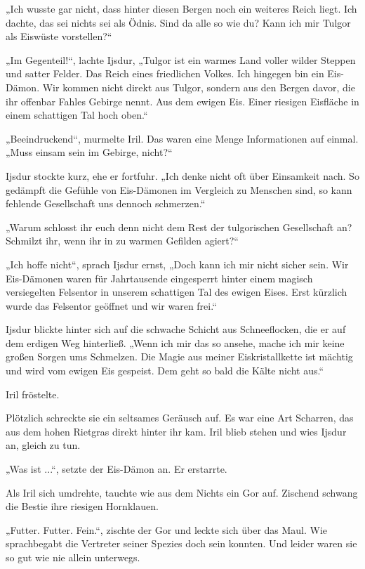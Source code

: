 „Ich wusste gar nicht, dass hinter diesen Bergen noch ein weiteres Reich liegt. Ich dachte, das sei nichts sei als Ödnis. Sind da alle so wie du? Kann ich mir Tulgor als Eiswüste vorstellen?“

„Im Gegenteil!“, lachte Ijsdur, „Tulgor ist ein warmes Land voller wilder Steppen und satter Felder. Das Reich eines friedlichen Volkes. Ich hingegen bin ein Eis-Dämon. Wir kommen nicht direkt aus Tulgor, sondern aus den Bergen davor, die ihr offenbar Fahles Gebirge nennt. Aus dem ewigen Eis. Einer riesigen Eisfläche in einem schattigen Tal hoch oben.“

„Beeindruckend“, murmelte Iril. Das waren eine Menge Informationen auf einmal. „Muss einsam sein im Gebirge, nicht?“

Ijsdur stockte kurz, ehe er fortfuhr. „Ich denke nicht oft über Einsamkeit nach. So gedämpft die Gefühle von Eis-Dämonen im Vergleich zu Menschen sind, so kann fehlende Gesellschaft uns dennoch schmerzen.“

„Warum schlosst ihr euch denn nicht dem Rest der tulgorischen Gesellschaft an? Schmilzt ihr, wenn ihr in zu warmen Gefilden agiert?“

„Ich hoffe nicht“, sprach Ijsdur ernst, „Doch kann ich mir nicht sicher sein. Wir Eis-Dämonen waren für Jahrtausende eingesperrt hinter einem magisch versiegelten Felsentor in unserem schattigen Tal des ewigen Eises. Erst kürzlich wurde das Felsentor geöffnet und wir waren frei.“

Ijsdur blickte hinter sich auf die schwache Schicht aus Schneeflocken, die er auf dem erdigen Weg hinterließ. „Wenn ich mir das so ansehe, mache ich mir keine großen Sorgen ums Schmelzen. Die Magie aus meiner Eiskristallkette ist mächtig und wird vom ewigen Eis gespeist. Dem geht so bald die Kälte nicht aus.“

Iril fröstelte.

Plötzlich schreckte sie ein seltsames Geräusch auf. Es war eine Art Scharren, das aus dem hohen Rietgras direkt hinter ihr kam. Iril blieb stehen und wies Ijsdur an, gleich zu tun.

„Was ist ...“, setzte der Eis-Dämon an. Er erstarrte.

Als Iril sich umdrehte, tauchte wie aus dem Nichts ein Gor auf. Zischend schwang die Bestie ihre riesigen Hornklauen.

„Futter. Futter. Fein.“, zischte der Gor und leckte sich über das Maul. Wie sprachbegabt die Vertreter seiner Spezies doch sein konnten. Und leider waren sie so gut wie nie allein unterwegs.

